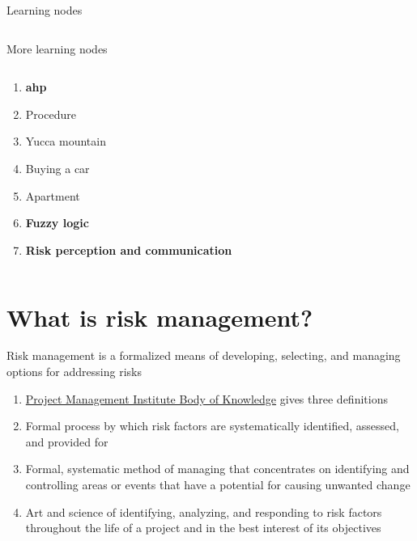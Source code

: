 \documentclass[aspectratio=1610,pdftex,dvipsnames,compress,xcolor={dvipsnames}]{beamer}
\newcommand{\acf}{\acrfull} %
\begin{document}
\begin{frame}{Learning nodes}
\begin{columns}[t]
    \end{columns}
\end{frame}


\begin{frame}{More learning nodes}
    \begin{columns}[t]

        \begin{column}{0.50\textwidth}
            \begin{enumerate}[series=outerlist,topsep=0pt,itemsep=1pt,leftmargin=*,label=(\arabic*)]
                \item[]\textbf{\acf{ahp}}
                \item[]Procedure  
                \item[]Yucca mountain
                \item[]Buying a car  
                \item[]Apartment
                    \vspace{0.10in}
                \item[]\textbf{Fuzzy logic}
                    \vspace{0.10in}
                \item[]\textbf{Risk perception and communication}
            \end{enumerate}
        \end{column}

        \begin{column}{0.50\textwidth}
        \end{column}

    \end{columns}
\end{frame}


\section{What is risk management?}


\addtocounter{framenumber}{-1}
\begin{frame}{Risk management is a formalized means of developing, selecting, and managing options for addressing risks}
    \begin{enumerate}[series=outerlist,topsep=0pt,itemsep=21pt,leftmargin=*,label=(\arabic*)]
        \item[]\href{https://www.pmi.org/pmbok-guide-standards/foundational/pmbok}{Project Management Institute Body of Knowledge} gives three definitions
        \item Formal process by which risk factors are systematically identified, assessed, and provided for
        \item Formal, systematic method of managing that concentrates on identifying and controlling areas or events that have a potential for causing unwanted change 
        \item Art and science of identifying, analyzing, and responding to risk factors throughout the life of a project and in the best interest of its objectives 
    \end{enumerate}
\end{frame}
\end{document}
